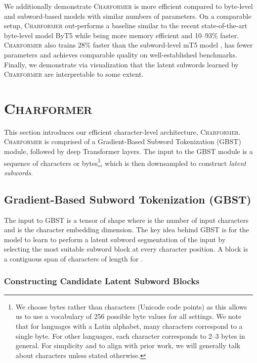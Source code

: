 \documentclass{article} \usepackage{iclr2022_conference,times}
\newcommand{\charformer}{\textsc{Charformer}\xspace}
\begin{document}
We additionally demonstrate \charformer is more efficient compared to byte-level and subword-based models with similar numbers of parameters. On a comparable setup, \charformer out-performs a baseline similar to the recent state-of-the-art byte-level model ByT5 \citep{Xue2021byt5} while being  more memory efficient and 10--93\% faster. \charformer also trains 28\% faster than the subword-level mT5 model \citep{xue2020mt5}, has  fewer parameters and achieves comparable quality on well-established benchmarks. Finally, we demonstrate via visualization that the latent subwords learned by \charformer are interpretable to some extent.

\section{\charformer}

This section introduces our efficient character-level architecture, \charformer. \charformer is comprised of a Gradient-Based Subword Tokenization (GBST) module, followed by deep Transformer layers. The input to the GBST module is a sequence of characters or bytes\footnote{We choose bytes rather than characters (Unicode code points) as this allows us to use a vocabulary of 256 possible byte values for all settings. We note that for languages with a Latin alphabet, many characters correspond to a single byte. For other languages, each character corresponds to 2--3 bytes in general. For simplicity and to align with prior work, we will generally talk about characters unless stated otherwise.}, which is then downsampled to construct \emph{latent subwords}.  

\subsection{Gradient-Based Subword Tokenization (GBST)}
The input to GBST is a tensor of shape  where  is the number of input characters and  is the character embedding dimension. The key idea behind GBST is for the model to learn to perform a latent subword segmentation of the input by selecting the most suitable subword block at every character position. A block is a contiguous span of characters  of length  for .


\subsubsection{Constructing Candidate Latent Subword Blocks}  \label{sec:constructing_subword_blocks}
\end{document}
